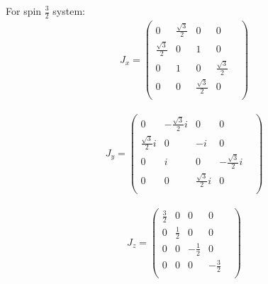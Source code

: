 \documentclass[10pt,a4paper]{article}
\begin{document}
For spin $\frac{3}{2}$ system:\begin{align}
J_x = \begin{pmatrix}
0&\frac{\sqrt{3}}{2}&0&0&\\\frac{\sqrt{3}}{2}&0&1&0&\\0&1&0&\frac{\sqrt{3}}{2}&\\0&0&\frac{\sqrt{3}}{2}&0&\\\end{pmatrix}\end{align}

\begin{align}
J_y = \begin{pmatrix}
0&-\frac{\sqrt{3}}{2}i&0&0&\\\frac{\sqrt{3}}{2}i&0&-i&0&\\0& i&0&-\frac{\sqrt{3}}{2}i&\\0&0&\frac{\sqrt{3}}{2}i&0&\\\end{pmatrix}\end{align}

\begin{align}
J_z = \begin{pmatrix}
\frac{3}{2}&0&0&0&\\0&\frac{1}{2}&0&0&\\0&0&-\frac{1}{2}&0&\\0&0&0&-\frac{3}{2}&\\\end{pmatrix}\end{align}
\end{document}
